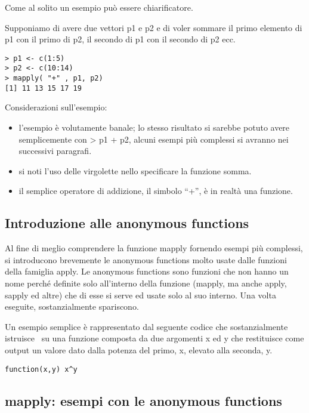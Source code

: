 Come al solito un esempio può essere chiarificatore.

Supponiamo di avere due vettori p1 e p2 e di voler sommare il primo elemento di p1 con il primo di p2, il secondo di p1 con il secondo di p2 ecc.

\begin{lstlisting}
> p1 <- c(1:5)
> p2 <- c(10:14)
> mapply( "+" , p1, p2)
[1] 11 13 15 17 19
\end{lstlisting}

Considerazioni sull'esempio:
\begin{itemize}
\item l'esempio è volutamente banale; lo stesso risultato si sarebbe potuto avere semplicemente con \textsf{> p1 + p2}, alcuni esempi più complessi si avranno nei successivi paragrafi. 
\item si noti l'uso delle virgolette nello specificare la funzione somma.
\item il semplice operatore di addizione, il simbolo ``+'', è in realtà una funzione.
\end{itemize}

\subsection{Introduzione alle anonymous functions}

Al fine di meglio comprendere la funzione \textsf{mapply} fornendo esempi più complessi, si introducono brevemente le anonymous functions molto usate dalle funzioni della famiglia \textsf{apply}. Le anonymous functions sono funzioni che non hanno un nome perché definite solo all'interno della funzione (\textsf{mapply}, ma anche \textsf{apply}, \textsf{sapply} ed altre) che di esse si serve ed usate solo al suo interno. Una volta eseguite, sostanzialmente spariscono.

Un esempio semplice è rappresentato dal seguente codice che sostanzialmente istruisce \erre\ su una funzione composta da due argomenti x ed y che restituisce come output un valore dato dalla potenza del primo, x, elevato alla seconda, y.

\begin{lstlisting}
function(x,y) x^y
\end{lstlisting}


\subsection{mapply: esempi con le anonymous functions}

